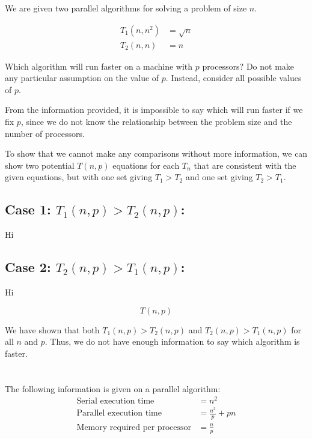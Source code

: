 \documentclass[twoside,10pt]{article}
\newcommand{\eqn}[1]{\begin{equation*}#1\end{equation*}}
\newcommand{\aln}[1]{\begin{align*}#1\end{align*}}
\begin{document}
\section{}

We are given two parallel algorithms for solving a problem of size $n$.

\aln{
T_1(n, n^2) &= \sqrt{n}\\
T_2(n, n) &= n
}

Which algorithm will run faster on a machine with $p$ processors?
Do not make any particular assumption on the value of $p$.
Instead, consider all possible values of $p$.

\quad From the information provided, it is impossible to say which will run faster if we fix $p$, since we do not know the relationship between the problem size and the number of processors.

\quad To show that we cannot make any comparisons without more information, we can show two potential $T(n,p)$ equations for each $T_n$ that are consistent with the given equations, but with one set giving $T_1 > T_2$ and one set giving $T_2 > T_1$.

\subsection{Case 1: $T_1(n, p) > T_2(n, p)$:}

\quad Hi

\subsection{Case 2: $T_2(n, p) > T_1(n, p)$:}

\quad Hi

\eqn{T(n, p)}

\quad We have shown that both $T_1(n, p) > T_2(n, p)$ and $T_2(n, p) > T_1(n, p)$ for all $n$ and $p$.
Thus, we do not have enough information to say which algorithm is faster.

\section{}

The following information is given on a parallel algorithm:
\aln{
  \text{Serial execution time} &= n^2\\
  \text{Parallel execution time} &= \frac{n^2}{p} + pn\\
  \text{Memory required per processor} &= \frac{n}{p}
}
\end{document}

